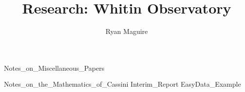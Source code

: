 \documentclass[crop=false,class=book,oneside]{standalone}
\begin{document}
    \newif\ifresearchwhitinobservatory
    \ifx\ifresearch\undefined
        \title{Research: Whitin Observatory}
        \author{Ryan Maguire}
        \date{\vspace{-5ex}}
        \maketitle
        \tableofcontents
        \listoffigures
        \listoftables
        \clearpage
    \fi
    
              {Notes_on_Miscellaneous_Papers}
    
              {Notes_on_the_Mathematics_of_Cassini}
    {Interim_Report}
    {EasyData_Example}
    \ifx\ifresearch\undefined
        
    \fi
\end{document}
